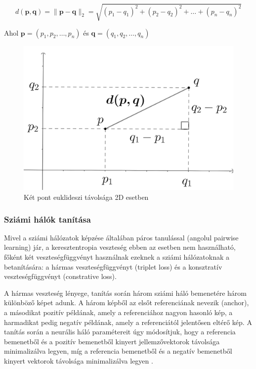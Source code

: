 
\[ d(\mathbf{p},\mathbf{q}) = \lVert \mathbf{p} - \mathbf{q} \rVert_2 = \sqrt{(p_1 - q_1)^2 + (p_2 - q_2)^2 + \dots + (p_n - q_n)^2}\]

Ahol $\mathbf{p} = (p_1, p_2, \dots, p_n)$ és $\mathbf{q} = (q_1, q_2, \dots, q_n)$ 

\begin{figure}[h]
	\centering
	\includegraphics[width=0.65\columnwidth]{figures/euklidesz.png}
	\caption{Két pont euklideszi távolsága 2D esetben}
\end{figure}

\subsubsection{Sziámi hálók tanítása}

Mivel a sziámi hálózatok képzése általában páros tanulással (angolul pairwise learning) jár, a keresztentropia veszteség ebben az esetben nem használható, főként két veszteségfüggvényt használnak ezeknek a sziámi hálózatoknak a betanítására: a hármas veszteségfüggvényt (triplet loss) és a konsztratív veszteségfüggvényt (constrative loss).

A hármas veszteség lényege, tanítás során három sziámi háló bemenetére három különböző képet adunk. A három képből az elsőt referenciának nevezik (anchor), a másodikat pozitív példának, amely a referenciához nagyon hasonló kép, a harmadikat pedig negatív példának, amely a referenciától jelentősen eltérő kép. A tanítás során a neurális háló paramétereit úgy módosítjuk, hogy a referencia bemenetből és a pozitív bemenetből kinyert jellemzővektorok távolsága minimalizálva legyen, míg a referencia bemenetből és a negatív bemenetből kinyert vektorok távolsága minimalizálva legyen \cite{hoffer2015triplet}.

